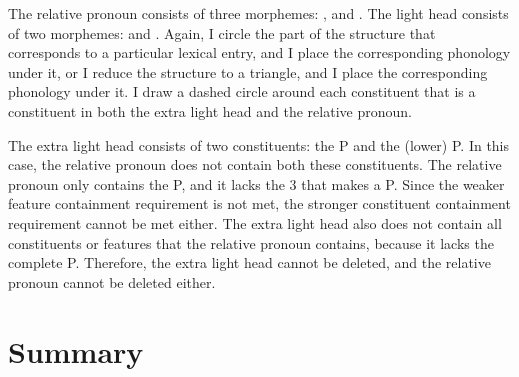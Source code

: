 The relative pronoun consists of three morphemes: ,  and .
The light head consists of two morphemes:  and .
Again, I circle the part of the structure that corresponds to a particular lexical entry, and I place the corresponding phonology under it, or I reduce the structure to a triangle, and I place the corresponding phonology under it.
I draw a dashed circle around each constituent that is a constituent in both the extra light head and the relative pronoun.

The extra light head consists of two constituents: the P and the (lower) P.
In this case, the relative pronoun does not contain both these constituents. The relative pronoun only contains the P, and it lacks the 3 that makes a P. Since the weaker feature containment requirement is not met, the stronger constituent containment requirement cannot be met either.
The extra light head also does not contain all constituents or features that the relative pronoun contains, because it lacks the complete P.
Therefore, the extra light head cannot be deleted, and the relative pronoun cannot be deleted either.

\section{Summary}
